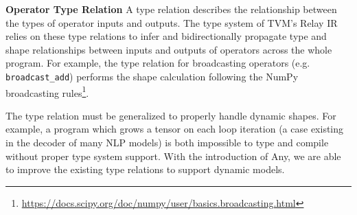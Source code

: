         \noindent
        {\bf Operator Type Relation} A type relation describes the relationship between the types of operator inputs and outputs. The type system of TVM's Relay IR relies on these type relations to infer and bidirectionally propagate type and shape relationships between inputs and outputs of operators across the whole program.
        For example, the type relation for broadcasting operators (e.g. \texttt{broadcast\_add}) performs the shape calculation following the NumPy broadcasting rules\footnote{\url{https://docs.scipy.org/doc/numpy/user/basics.broadcasting.html}}.

        The type relation must be generalized to properly handle dynamic shapes. For example, a program which grows a tensor on each loop iteration (a case existing in the decoder of many NLP models) is both impossible to type and compile without proper type system support. With the introduction of Any, we are able to improve the existing type relations to support dynamic models.


